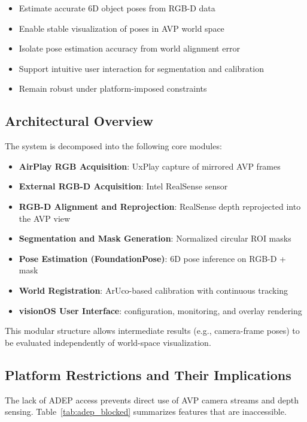 \documentclass[11pt]{article}
\begin{document}
\begin{itemize}
    \item Estimate accurate $6$D object poses from RGB-D data
    \item Enable stable visualization of poses in AVP world space
    \item Isolate pose estimation accuracy from world alignment error
    \item Support intuitive user interaction for segmentation and calibration
    \item Remain robust under platform-imposed constraints
\end{itemize}

\subsection{Architectural Overview}

The system is decomposed into the following core modules:

\begin{itemize}
    \item \textbf{AirPlay RGB Acquisition}: UxPlay capture of mirrored AVP frames
    \item \textbf{External RGB-D Acquisition}: Intel RealSense sensor
    \item \textbf{RGB-D Alignment and Reprojection}: RealSense depth reprojected into the AVP view
    \item \textbf{Segmentation and Mask Generation}: Normalized circular ROI masks
    \item \textbf{Pose Estimation (FoundationPose)}: $6$D pose inference on RGB-D + mask
    \item \textbf{World Registration}: ArUco-based calibration with continuous tracking
    \item \textbf{visionOS User Interface}: configuration, monitoring, and overlay rendering
\end{itemize}

This modular structure allows intermediate results (e.g., camera-frame poses) to be evaluated independently of world-space visualization.

\subsection{Platform Restrictions and Their Implications}

The lack of ADEP access prevents direct use of AVP camera streams and depth sensing. Table~\ref{tab:adep_blocked} summarizes features that are inaccessible.
\end{document}
